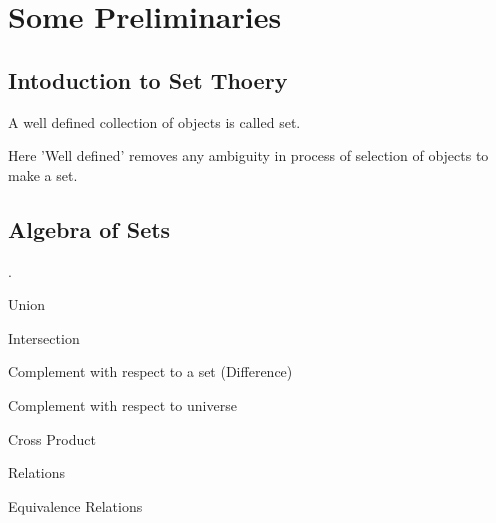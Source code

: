 \chapter{Some Preliminaries}
\section{Intoduction to Set Thoery}
\begin{defn}
	A well defined collection of objects is called set.
\end{defn}
Here 'Well defined' removes any ambiguity in process of selection of objects to make a set.
\section{Algebra of Sets}
.

Union

Intersection

Complement with respect to a set (Difference)

Complement with respect to universe

Cross Product

Relations

Equivalence Relations

